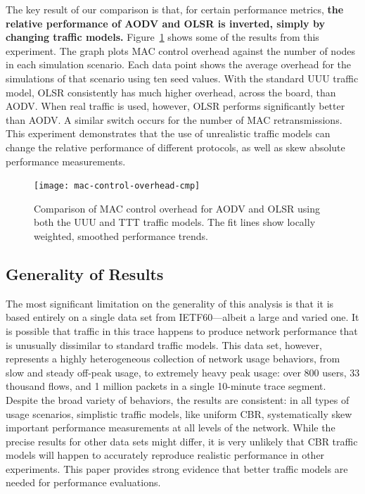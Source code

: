 \documentclass[conference]{IEEEtran}
\newcommand{\caps}[1]{{\small{#1}}}
\begin{document}
The key result of our comparison is that, for certain performance metrics, \textbf{the relative performance of \caps{AODV} and \caps{OLSR} is inverted, simply  by changing traffic models.} Figure~\ref{fig:mac-control-overhead-cmp} shows some of the results from this experiment. The graph plots \caps{MAC} control overhead against the number of nodes in each simulation scenario. Each data point shows the average overhead for the simulations of that scenario using ten seed values. With the standard \caps{UUU} traffic model, \caps{OLSR} consistently has much higher overhead, across the board, than \caps{AODV}. When real traffic is used, however, \caps{OLSR} performs significantly better than \caps{AODV}. A similar switch occurs for the number of \caps{MAC} retransmissions. This experiment demonstrates that the use of unrealistic traffic models can change the relative performance of different protocols, as well as skew absolute performance measurements.

\begin{figure}
\vspace{0.6em}
\begin{centering}
\texttt{[image: mac-control-overhead-cmp]}
\caption{Comparison of {\footnotesize{MAC}} control overhead for {\footnotesize{AODV}} and {\footnotesize{OLSR}} using both the {\footnotesize{UUU}} and {\footnotesize{TTT}} traffic models. The fit lines show locally weighted, smoothed performance trends.}
\label{fig:mac-control-overhead-cmp}
\end{centering}
\vspace{-1.5em}
\end{figure}

\subsection{Generality of Results}


The most significant limitation on the generality of this analysis is that it is based entirely on a single data set from \caps{IETF60}---albeit a large and varied one. It is possible that traffic in this trace happens to produce network performance that is unusually dissimilar to standard traffic models. This data set, however, represents a highly heterogeneous collection of network usage behaviors, from slow and steady off-peak usage, to extremely heavy peak usage: over 800 users, 33 thousand flows, and 1 million packets in a single 10-minute trace segment. Despite the broad variety of behaviors, the results are consistent: in all types of usage scenarios, simplistic traffic models, like uniform \caps{CBR}, systematically skew important performance measurements at all levels of the network. While the precise results for other data sets might differ, it is very unlikely that \caps{CBR} traffic models will happen to accurately reproduce realistic performance in other experiments. This paper provides strong evidence that better traffic models are needed for performance evaluations.
\end{document}
